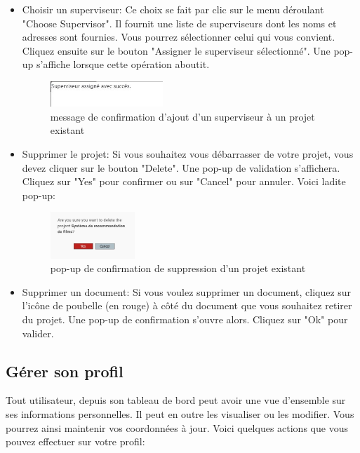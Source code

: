 \documentclass[12pt]{article}
\begin{document}
\begin{itemize}
        \medskip

    \item Choisir un superviseur: Ce choix se fait par clic sur le menu déroulant "Choose Supervisor". Il fournit une liste de superviseurs dont les noms et adresses sont fournies. Vous pourrez sélectionner celui qui vous convient. Cliquez ensuite sur le bouton "Assigner le superviseur sélectionné". Une pop-up s'affiche lorsque cette opération aboutit.
        \begin{figure}[h!]
            \centering
            \includegraphics[width=0.4\textwidth]{./images/choose-superviseur.jpg}
            \caption{message de confirmation d'ajout d'un superviseur à un projet existant}
            \label{fig:message de confirmation d'ajout d'un superviseur à un projet existant}
        \end{figure}
        
        \medskip

    \item Supprimer le projet: Si vous souhaitez vous débarrasser de votre projet, vous devez cliquer sur le bouton "Delete". Une pop-up de validation s'affichera. Cliquez sur "Yes" pour confirmer ou sur "Cancel" pour annuler. Voici ladite pop-up:
        \begin{figure}[h!]
            \centering
            \includegraphics[width=0.3\textwidth]{./images/delete-project.jpg}
            \caption{pop-up de confirmation de suppression d'un projet existant}
            \label{fig:pop-up de confirmation de suppression d'un projet existant}
        \end{figure}

       \newpage
    \item Supprimer un document: Si vous voulez supprimer un document, cliquez sur l'icône de poubelle (en rouge) à côté du document que vous souhaitez retirer du projet. Une pop-up de confirmation s'ouvre alors. Cliquez sur "Ok" pour valider.     
\end{itemize}

\medskip
\subsection{Gérer son profil}
Tout utilisateur, depuis son tableau de bord peut avoir une vue d'ensemble sur ses informations personnelles. Il peut en outre les visualiser ou les modifier. Vous pourrez ainsi maintenir vos coordonnées à jour.
Voici quelques actions que vous pouvez effectuer sur votre profil:
\end{document}
